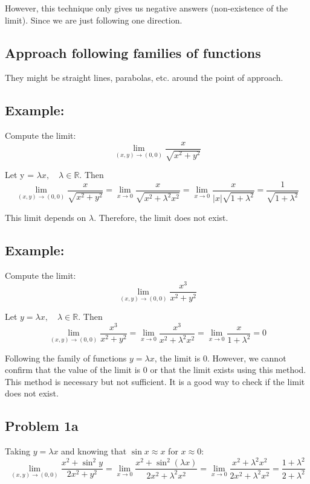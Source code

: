\documentclass[11pt]{article}
\begin{document}
However, this technique only gives us negative answers (non-existence of the limit). Since we are just following one direction.

\subsection{Approach following families of functions}
They might be straight lines, parabolas, etc. around the point of approach.

\subsection*{Example:}
Compute the limit:
\[
\lim_{(x,y) \to (0,0)} \frac{x}{\sqrt{x^2 + y^2}}
\]

Let y = $\lambda x, \quad \lambda \in \mathbb{R}$. Then
\[
\lim_{(x,y) \to (0,0)} \frac{x}{\sqrt{x^2 + y^2}} = \lim_{x \to 0} \frac{x}{\sqrt{x^2 + \lambda^2 x^2}} = \lim_{x \to 0} \frac{x}{|x|\sqrt{1 + \lambda^2}} = \frac{1}{\sqrt{1 + \lambda^2}}
\]

This limit depends on $\lambda$. Therefore, the limit does not exist.

\subsection*{Example:}
Compute the limit:
\[
\lim_{(x,y) \to (0,0)} \frac{x^3}{x^2 + y^2}
\]

Let $y = \lambda x, \quad \lambda \in \mathbb{R}$. Then
\[
\lim_{(x,y) \to (0,0)} \frac{x^3}{x^2 + y^2} = \lim_{x \to 0} \frac{x^3}{x^2 + \lambda^2 x^2} = \lim_{x \to 0} \frac{x}{1 + \lambda^2} = 0
\]

Following the family of functions $y = \lambda x$, the limit is 0. However, we cannot confirm that the value of the limit is 0 or that the limit exists using this method.
\vskip 0.5cm
This method is necessary but not sufficient. It is a good way to check if the limit does not exist.

\subsection*{Problem 1a}
Taking $y = \lambda x$ and knowing that $\sin x \approx x$ for $x \approx 0$:
\[
\lim_{(x,y) \to (0,0)} \frac{x^2 + \sin^2 y}{2x^2 + y^2} = \lim_{x \to 0} \frac{x^2 + \sin^2(\lambda x)}{2x^2 + \lambda^2x^2} = \lim_{x \to 0} \frac{x^2 + \lambda^2 x^2}{2x^2 + \lambda^2x^2} = \frac{1 + \lambda^2}{2 + \lambda^2}
\]
\end{document}
